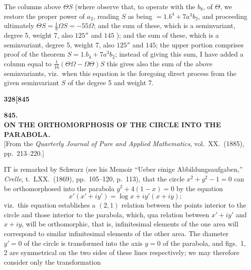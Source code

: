 \documentclass[11pt,a4paper]{book}
\begin{document}
The columns above $\Theta S$ (where observe that, to operate with the $b_8$, of $\Theta$, we restore the proper power of $a_2$, reading $S$ as being $= 1.b^4 + 7a^3b_2$, and proceeding ultimately $\Theta S = \frac{1}{8}\Omega S = -55\Omega$; and the sum of these, which is a seminvariant, degree 5, weight 7, also $125''$ and $145$ ); and the sum of these, which is a seminvariant, degree 5, weight 7, also $125''$ and $145$; the upper portion comprises proof of the theorem $S = 1.b_4 + 7a^3b_2$; instead of giving this sum, I have added a column equal to $\frac{1}{16}(\Theta\Omega - \Omega\Theta)S$ this gives also the sum of the above seminvariants, viz.\ when this equation is the foregoing direct process from the given seminvariant $S$ of the degree 5 and weight 7.

\vspace{2em}


\newpage
\setcounter{page}{328}

\noindent\textbf{328}\hfill\textbf{[845}

\bigskip

\begin{center}
{\Large\textbf{845.}}\\[1em]
{\large\textbf{ON THE ORTHOMORPHOSIS OF THE CIRCLE INTO THE PARABOLA.}}\\[1em]
[From the \textit{Quarterly Journal of Pure and Applied Mathematics}, vol.\ XX.\ (1885), pp.\ 213--220.]
\end{center}

\bigskip

\noindent IT is remarked by Schwarz (see his Memoir ``Ueber einige Abbildungsaufgaben,'' \textit{Crelle}, t.\ LXX.\ (1869), pp.\ 105--120, p.\ 113), that the circle $x^2 + y^2 - 1 = 0$ can be orthomorphosed into the parabola $y^2 + 4(1 - x) = 0$ by the equation
\[
x'(x' + iy') = \log x + iy'(x + iy);
\]
viz.\ this equation establishes a $(2, 1)$ relation between the points interior to the circle and those interior to the parabola, which, qua relation between $x' + iy'$ and $x + iy$, will be orthomorphic, that is, infinitesimal elements of the one area will correspond to similar infinitesimal elements of the other area. The diameter $y' = 0$ of the circle is transformed into the axis $y = 0$ of the parabola, and figs.\ 1, 2 are symmetrical on the two sides of these lines respectively; we may therefore consider only the transformation
\end{document}
